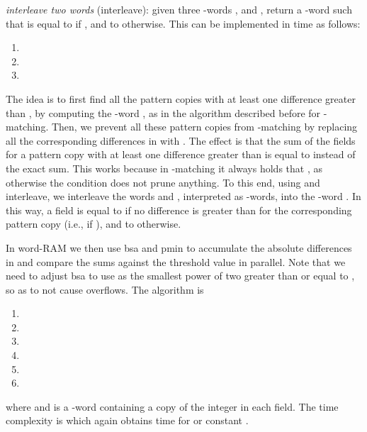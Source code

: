 \documentclass{llncs}
\newcommand{\fsize}{f}
\newcommand{\fword}[1]{-word}
\begin{document}
\medskip
\noindent \emph{interleave two words}
(\textsf{interleave}): given three \fword{f}s ,
 and , return a \fword{f}  such that  is
equal to  if , and to  otherwise. This can be
implemented in  time as follows:
\begin{enumerate}
\item 
\item 
\item 
\end{enumerate}
The idea is to first find all the pattern copies with at least one
difference greater than , by computing the
\fword{\bar{m}\log\sigma} , as in the algorithm described before for
-matching. Then, we prevent all these pattern copies from
-matching by replacing all the corresponding differences in
 with . The effect is that the sum of the fields for a
pattern copy with at least one difference greater than  is
equal to  instead of the exact sum. This works because in
-matching it always holds that , as
otherwise the  condition does not prune anything. To this end,
using  and \textsf{interleave}, we interleave the words  and
, interpreted as \fword{m\log\sigma}s, into the \fword{\log\sigma}
. In this way, a field  is equal to  if no difference
is greater than  for the corresponding pattern copy (i.e., if
), and to  otherwise.


In word-RAM we then use \textsf{bsa} and \textsf{pmin} to accumulate
the absolute differences in  and compare the sums against the
threshold value  in parallel. Note that we need to adjust
\textsf{bsa} to use as  the smallest power of two greater than or
equal to , so as to not cause overflows.
The algorithm is
\begin{enumerate}
\item 
\item 
\item 
\item 
\item 
\item 
\end{enumerate}
where  and  is a \fword{\fsize}
containing a copy of the integer  in each field.
The time complexity is
 which again obtains
 time for  or constant .

\medskip
\end{document}
